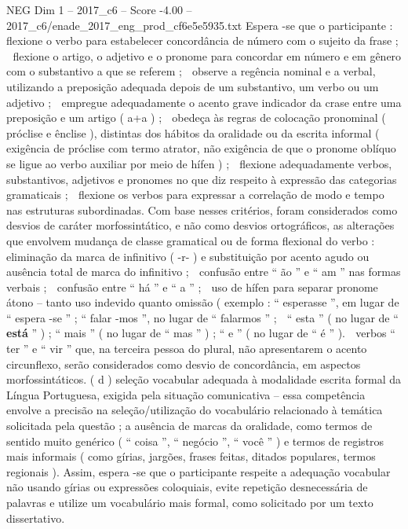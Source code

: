 \begin{textsample}{NEG Dim 1 – 2017\_c6 – Score -4.00 – 2017\_c6/enade\_2017\_eng\_prod\_cf6e5e5935.txt}
Espera -se que o participante :  flexione o verbo para estabelecer concordância de número com o sujeito da frase ;  flexione o artigo, o adjetivo e o pronome para concordar em número e em gênero com o substantivo a que se referem ;  observe a regência nominal e a verbal, utilizando a preposição adequada depois de um substantivo, um verbo ou um adjetivo ;  empregue adequadamente o acento grave indicador da crase entre uma preposição e um artigo ( a+a ) ;  obedeça às regras de colocação pronominal ( próclise e ênclise ), distintas dos hábitos da oralidade ou da escrita informal ( exigência de próclise com termo atrator, não exigência de que o pronome oblíquo se ligue ao verbo auxiliar por meio de hífen ) ;  flexione adequadamente verbos, substantivos, adjetivos e pronomes no que diz respeito à expressão das categorias gramaticais ;  flexione os verbos para expressar a correlação de modo e tempo nas estruturas subordinadas.
Com base nesses critérios, foram considerados como desvios de caráter morfossintático, e não como desvios ortográficos, as alterações que envolvem mudança de classe gramatical ou de forma flexional do verbo :  eliminação da marca de infinitivo ( -r- ) e substituição por acento agudo ou ausência total de marca do infinitivo ;  confusão entre “ ão ” e “ am ” nas formas verbais ;  confusão entre “ há ” e “ a ” ;  uso de hífen para separar pronome átono – tanto uso indevido quanto omissão ( exemplo : “ esperasse ”, em lugar de “ espera -se ” ; “ falar -mos ”, no lugar de “ falarmos ” ;  “ esta ” ( no lugar de “ \textbf{está} ” ) ; “ mais ” ( no lugar de “ mas ” ) ; “ e ” ( no lugar de “ é ” ).  verbos “ ter ” e “ vir ” que, na terceira pessoa do plural, não apresentarem o acento circunflexo, serão considerados como desvio de concordância, em aspectos morfossintáticos. ( d ) seleção vocabular adequada à modalidade escrita formal da Língua Portuguesa, exigida pela situação comunicativa – essa competência envolve a precisão na seleção/utilização do vocabulário relacionado à temática solicitada pela questão ; a ausência de marcas da oralidade, como termos de sentido muito genérico ( “ coisa ”, “ negócio ”, “ você ” ) e termos de registros mais informais ( como gírias, jargões, frases feitas, ditados populares, termos regionais ).
Assim, espera -se que o participante respeite a adequação vocabular não usando gírias ou expressões coloquiais, evite repetição desnecessária de palavras e utilize um vocabulário mais formal, como solicitado por um texto dissertativo.

\end{textsample}
